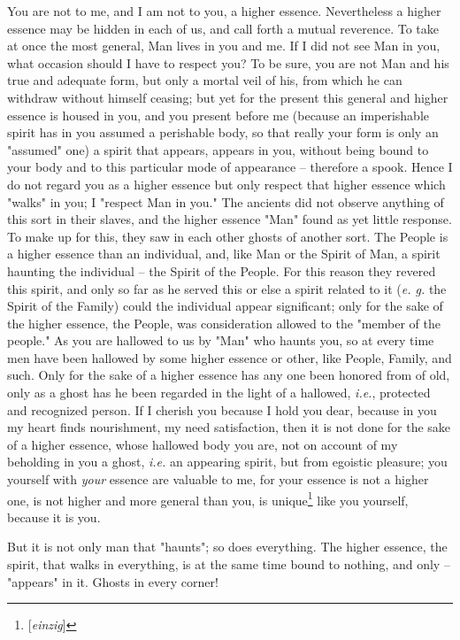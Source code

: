 You are not to me, and I am not to you, a higher essence. Nevertheless a 
higher essence may be hidden in each of us, and call forth a mutual reverence. 
To take at once the most general, Man lives in you and me. If I did not see 
Man in you, what occasion should I have to respect you? To be sure, you are 
not Man and his true and adequate form, but only a mortal veil of his, from 
which he can withdraw without himself ceasing; but yet for the present this 
general and higher essence is housed in you, and you present before me 
(because an imperishable spirit has in you assumed a perishable body, so that 
really your form is only an "{}assumed"{} one) a spirit that appears, appears 
in you, without being bound to your body and to this particular mode of 
appearance -- therefore a spook. Hence I do not regard you as a higher essence 
but only respect that higher essence which "{}walks"{} in you; I "{}respect 
Man in you."{} The ancients did not observe anything of this sort in their 
slaves, and the higher essence "{}Man"{} found as yet little response. To make 
up for this, they saw in each other ghosts of another sort. The People is a 
higher essence than an individual, and, like Man or the Spirit of Man, a 
spirit haunting the individual -- the Spirit of the People. For this reason 
they revered this spirit, and only so far as he served this or else a spirit 
related to it (\textit{e. g.} the Spirit of the Family) could the individual 
appear significant; only for the sake of the higher essence, the People, was 
consideration allowed to the "{}member of the people."{} As you are hallowed 
to us by "{}Man"{} who haunts you, so at every time men have been hallowed by 
some higher essence or other, like People, Family, and such. Only for the sake 
of a higher essence has any one been honored from of old, only as a ghost has 
he been regarded in the light of a hallowed, \textit{i.e.}, protected and 
recognized person. If I cherish you because I hold you dear, because in you my 
heart finds nourishment, my need satisfaction, then it is not done for the 
sake of a higher essence, whose hallowed body you are, not on account of my 
beholding in you a ghost, \textit{i.e.} an appearing spirit, but from egoistic 
pleasure; you yourself with \textit{your} essence are valuable to me, for your 
essence is not a higher one, is not higher and more general than you, is 
unique\footnote{[\textit{einzig}]} like you yourself, because it is you.

But it is not only man that "{}haunts"{}; so does everything. The higher 
essence, the spirit, that walks in everything, is at the same time bound to 
nothing, and only -- "{}appears"{} in it. Ghosts in every corner!

